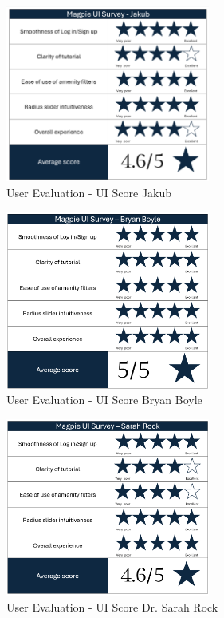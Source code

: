 \begin{figure}[htbp]
    \centering
    \includegraphics[width=0.6\textwidth]{images/survey-jakub.png}
    \caption{User Evaluation - UI Score Jakub}
    \label{fig:jakubscore}
\end{figure}

\begin{figure}[htbp]
    \centering
    \includegraphics[width=0.6\textwidth]{images/survey-bryan.png}
    \caption{User Evaluation - UI Score Bryan Boyle}
    \label{fig:bryanscore}
\end{figure}

\begin{figure}[htbp]
    \centering
    \includegraphics[width=0.6\textwidth]{images/survey-sarah.png}
    \caption{User Evaluation - UI Score Dr. Sarah Rock}
    \label{fig:sarahscore}
\end{figure}

